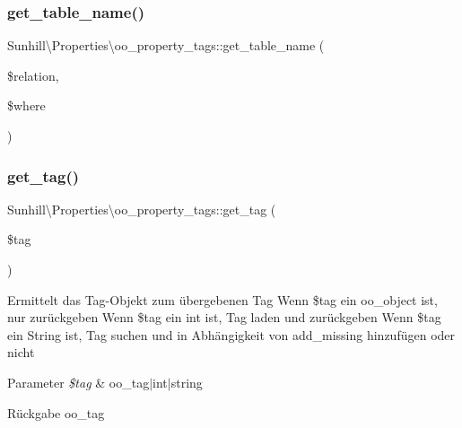 \subsubsection{\texorpdfstring{get\+\_\+table\+\_\+name()}{get\_table\_name()}}
{\footnotesize\ttfamily Sunhill\textbackslash{}\+Properties\textbackslash{}oo\+\_\+property\+\_\+tags\+::get\+\_\+table\+\_\+name (\begin{DoxyParamCaption}\item[{}]{\$relation,  }\item[{}]{\$where }\end{DoxyParamCaption})}

\mbox{\label{classSunhill_1_1Properties_1_1oo__property__tags_a9683501aa69bc9b308328dcd705318ba}} 
\subsubsection{\texorpdfstring{get\+\_\+tag()}{get\_tag()}}
{\footnotesize\ttfamily Sunhill\textbackslash{}\+Properties\textbackslash{}oo\+\_\+property\+\_\+tags\+::get\+\_\+tag (\begin{DoxyParamCaption}\item[{}]{\$tag }\end{DoxyParamCaption})\hspace{0.3cm}{\ttfamily [protected]}}

Ermittelt das Tag-\/\+Objekt zum übergebenen Tag Wenn \$tag ein oo\+\_\+object ist, nur zurückgeben Wenn \$tag ein int ist, Tag laden und zurückgeben Wenn \$tag ein String ist, Tag suchen und in Abhängigkeit von add\+\_\+missing hinzufügen oder nicht 
\begin{DoxyParams}{Parameter}
{\em \$tag} & oo\+\_\+tag$\vert$int$\vert$string \\
\hline
\end{DoxyParams}
\begin{DoxyReturn}{Rückgabe}
oo\+\_\+tag 
\end{DoxyReturn}
\mbox{\label{classSunhill_1_1Properties_1_1oo__property__tags_a7bcb02809f3d490c0f51dda09b2ae9ea}} 
